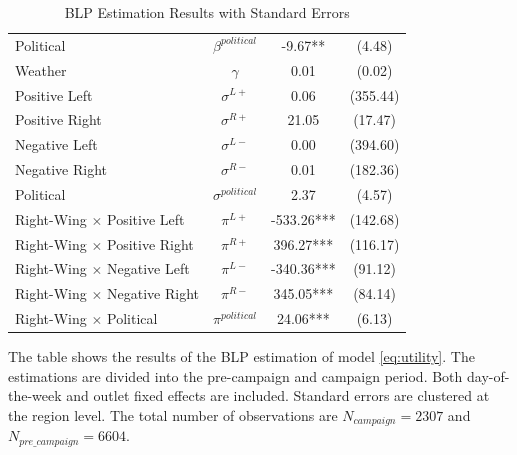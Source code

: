 \documentclass[12pt]{article}
\begin{document}
\begin{table}[ht]
\begin{threeparttable}
\begin{tabular}{lccc}
				Political & $\beta^{political}$ & -9.67** & (4.48) \\
				Weather & $\gamma$ & 0.01 & (0.02) \\
				\hline
				Positive Left & $\sigma^{L+}$ & 0.06 & (355.44) \\
				Positive Right & $\sigma^{R+}$ & 21.05 & (17.47) \\
				Negative Left & $\sigma^{L-}$ & 0.00 & (394.60) \\
				Negative Right & $\sigma^{R-}$ & 0.01 & (182.36) \\
				Political & $\sigma^{political}$ & 2.37 & (4.57) \\
				\hline
				Right-Wing $\times$  Positive Left & $\pi^{L+}$ & -533.26*** & (142.68) \\
				Right-Wing $\times$  Positive Right & $\pi^{R+}$ & 396.27*** & (116.17) \\
				Right-Wing $\times$  Negative Left & $\pi^{L-}$ & -340.36*** & (91.12) \\
				Right-Wing $\times$  Negative Right & $\pi^{R-}$ & 345.05*** & (84.14) \\
				Right-Wing $\times$  Political & $\pi^{political}$ & 24.06*** & (6.13) \\
				\hline
				\hline
			\end{tabular}
			\caption{BLP Estimation Results with Standard Errors}
			\begin{tablenotes}
				\small
				\item \footnotesize{The table shows the results of the BLP estimation of model \ref{eq:utility}. The estimations are divided into the pre-campaign and campaign period. Both day-of-the-week and outlet fixed effects are included. Standard errors are clustered at the region level. The total number of observations are $N_{campaign}=2307$ and  $N_{pre\_campaign}=6604$.}
			\end{tablenotes}
		\end{threeparttable}
	\end{table}
	
	
	
	
	
	
	
\end{document}
